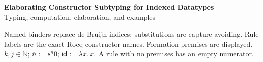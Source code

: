 \documentclass[10pt,a4paper]{article}
\newcommand{\op}[1]{\mathsf{#1}}
\newcommand{\id}{\op{id}}
\newcommand{\pos}[1]{\overline{#1}}
\begin{document}
\begin{center}
{\Large\bfseries Elaborating Constructor Subtyping for Indexed Datatypes}\\[3pt]
Typing, computation, elaboration, and examples
\end{center}
Named binders replace de Bruijn indices; substitutions are capture avoiding.
Rule labels are the exact Rocq constructor names. Formation premises are
displayed. $k,j\in\mathbb N$; $\pos{n}:=\op{s}^{n}0$;
$\id:=\lambda x.\,x$. A rule with no premises has an empty numerator.





\end{document}
